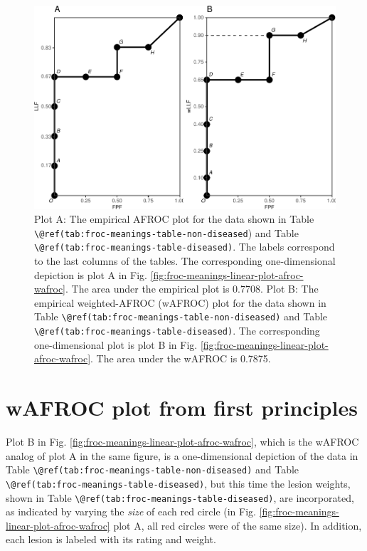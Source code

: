 \documentclass[
]{book}
\begin{document}
\begin{figure}
\centering
\includegraphics{14-meanings-foms_files/figure-latex/froc-meanings-afroc-wafroc-1.pdf}
\caption{\label{fig:froc-meanings-afroc-wafroc}Plot A: The empirical AFROC plot for the data shown in Table \texttt{\textbackslash{}@ref(tab:froc-meanings-table-non-diseased}) and Table \texttt{\textbackslash{}@ref(tab:froc-meanings-table-diseased)}. The labels correspond to the last columns of the tables. The corresponding one-dimensional depiction is plot A in Fig. \ref{fig:froc-meanings-linear-plot-afroc-wafroc}. The area under the empirical plot is 0.7708. Plot B: The empirical weighted-AFROC (wAFROC) plot for the data shown in Table \texttt{\textbackslash{}@ref(tab:froc-meanings-table-non-diseased)} and Table \texttt{\textbackslash{}@ref(tab:froc-meanings-table-diseased)}. The corresponding one-dimensional plot is plot B in Fig. \ref{fig:froc-meanings-linear-plot-afroc-wafroc}. The area under the wAFROC is 0.7875.}
\end{figure}

\hypertarget{froc-meanings-wAFROC-plot-first-principles}{%
\section{wAFROC plot from first principles}\label{froc-meanings-wAFROC-plot-first-principles}}

Plot B in Fig. \ref{fig:froc-meanings-linear-plot-afroc-wafroc}, which is the wAFROC analog of plot A in the same figure, is a one-dimensional depiction of the data in Table \texttt{\textbackslash{}@ref(tab:froc-meanings-table-non-diseased)} and Table \texttt{\textbackslash{}@ref(tab:froc-meanings-table-diseased)}, but this time the lesion weights, shown in Table \texttt{\textbackslash{}@ref(tab:froc-meanings-table-diseased)}, are incorporated, as indicated by varying the \emph{size} of each red circle (in Fig. \ref{fig:froc-meanings-linear-plot-afroc-wafroc} plot A, all red circles were of the same size). In addition, each lesion is labeled with its rating and weight.
\end{document}
